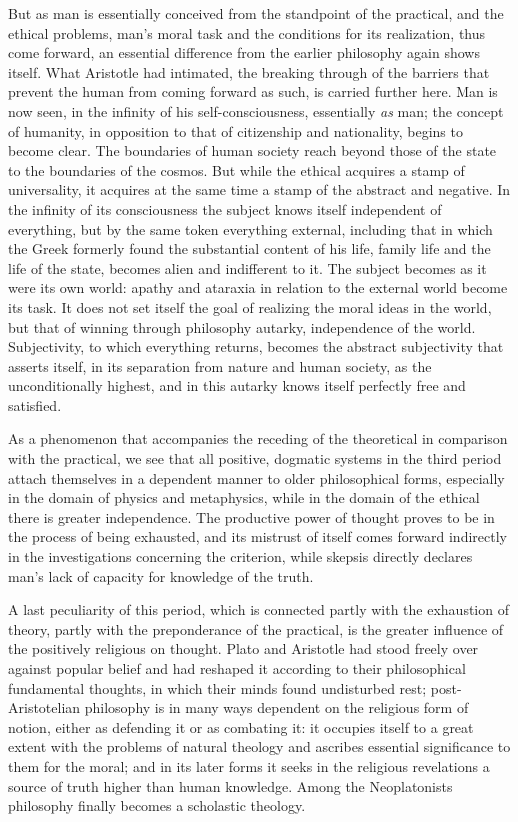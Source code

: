 But as man is essentially conceived from the standpoint of the practical, and
the ethical problems, man's moral task and the conditions for its realization,
thus come forward, an essential difference from the earlier philosophy again
shows itself. What Aristotle had intimated, the breaking through of the
barriers that prevent the human from coming forward as such, is carried
further here. Man is now seen, in the infinity of his self-consciousness,
essentially \emph{as} man; the concept of humanity, in opposition to that of
citizenship and nationality, begins to become clear. The boundaries of human
society reach beyond those of the state to the boundaries of the cosmos. But
while the ethical acquires a stamp of universality, it acquires at the same
time a stamp of the abstract and negative. In the infinity of its
consciousness the subject knows itself independent of everything, but by the
same token everything external, including that in which the Greek
formerly found the substantial content of his life, family life and the life of
the state, becomes alien and indifferent to it. The subject becomes as it were
its own world: apathy and ataraxia in relation to the external world become
its task. It does not set itself the goal of realizing the moral ideas in the
world, but that of winning through philosophy autarky, independence of the
world. Subjectivity, to which everything returns, becomes the abstract
subjectivity that asserts itself, in its separation from nature and human
society, as the unconditionally highest, and in this autarky knows itself
perfectly free and satisfied.

As a phenomenon that accompanies the receding of the theoretical in comparison
with the practical, we see that all positive, dogmatic systems in the third
period attach themselves in a dependent manner to older philosophical forms,
especially in the domain of physics and metaphysics, while in the domain of
the ethical there is greater independence. The productive power of thought
proves to be in the process of being exhausted, and its mistrust of itself
comes forward indirectly in the investigations concerning the criterion, while
skepsis directly declares man's lack of capacity for knowledge of the truth.

A last peculiarity of this period, which is connected partly with the
exhaustion of theory, partly with the preponderance of the practical, is the
greater influence of the positively religious on thought. Plato and Aristotle
had stood freely over against popular belief and had reshaped it according to
their philosophical fundamental thoughts, in which their minds found
undisturbed rest; post-Aristotelian philosophy is in many ways dependent on
the religious form of notion, either as defending it or as combating it: it
occupies itself to a great extent with the problems of natural theology and
ascribes essential significance to them for the moral; and in its later forms
it seeks in the religious revelations a source of truth higher than human
knowledge. Among the Neoplatonists philosophy finally becomes a
scholastic theology.

